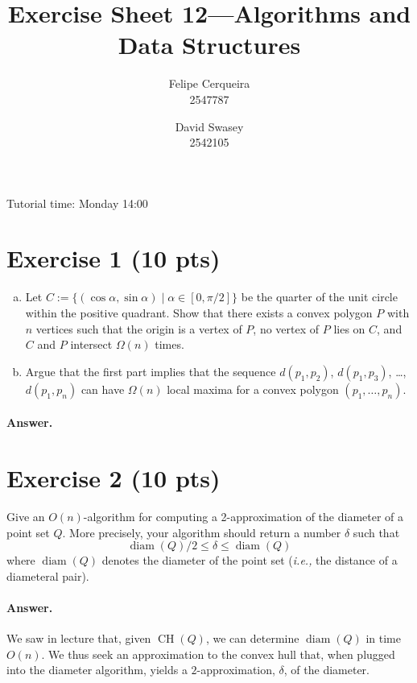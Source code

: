 \documentclass[a4paper]{article}
\title{Exercise Sheet 12---Algorithms and Data Structures}
\author{Felipe Cerqueira \\ 2547787 \and David Swasey \\ 2542105}
\newcommand{\ie}{\emph{i.e.,} }
\DeclareMathOperator{\diam}{diam}
\DeclareMathOperator{\CH}{CH}
\begin{document}
\maketitle

Tutorial time: Monday 14:00


\section*{Exercise 1 (10 pts)}

\begin{enumerate}[a)]

\item Let $C := \{ (\cos \alpha, \sin \alpha) \mid \alpha \in [0, \pi/2] \}$ be the quarter of the unit circle within the positive quadrant.
Show that there exists a convex polygon $P$ with $n$ vertices such that the origin is a vertex of $P$, no vertex of $P$ lies on $C$, and $C$ and $P$ intersect $\Omega(n)$ times.

\item Argue that the first part implies that the sequence $d(p_1, p_2)$, $d(p_1, p_3)$, \ldots, $d(p_1, p_n)$ can have $\Omega(n)$ local maxima for a convex polygon $(p_1, \ldots, p_n)$.

\end{enumerate}

\paragraph{Answer.}


\section*{Exercise 2 (10 pts)}

Give an $O(n)$-algorithm for computing a 2-approximation of the diameter of a point set $Q$.
More precisely, your algorithm should return a number $\delta$ such that
\[
	\diam(Q)/2 \le \delta \le \diam(Q)
\]
where $\diam(Q)$ denotes the diameter of the point set (\ie the distance of a diameteral pair).

\paragraph{Answer.}

We saw in lecture that, given $\CH(Q)$, we can determine $\diam(Q)$ in time $O(n)$.
We thus seek an approximation to the convex hull that, when plugged into the diameter algorithm, yields a $2$-approximation, $\delta$, of the diameter.
\end{document}
